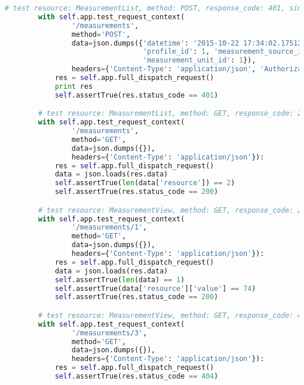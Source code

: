 \begin{itemize}
\begin{lstlisting}[language=Python]
        # test resource: MeasurementList, method: POST, response_code: 401, sin autorizacion, token invalido
        with self.app.test_request_context(
                '/measurements',
                method='POST',
                data=json.dumps({'datetime': '2015-10-22 17:34:02.175126', 'value': 68, 'analysis_id': 1,
                                 'profile_id': 1, 'measurement_source_id': 1, 'measurement_type_id': 1,
                                 'measurement_unit_id': 1}),
                headers={'Content-Type': 'application/json', 'Authorization': 'Basic ' + token_a}):
            res = self.app.full_dispatch_request()
            print res
            self.assertTrue(res.status_code == 401)

        # test resource: MeasurementList, method: GET, response_code: 200
        with self.app.test_request_context(
                '/measurements',
                method='GET',
                data=json.dumps({}),
                headers={'Content-Type': 'application/json'}):
            res = self.app.full_dispatch_request()
            data = json.loads(res.data)
            self.assertTrue(len(data['resource']) == 2)
            self.assertTrue(res.status_code == 200)

        # test resource: MeasurementView, method: GET, response_code: 200
        with self.app.test_request_context(
                '/measurements/1',
                method='GET',
                data=json.dumps({}),
                headers={'Content-Type': 'application/json'}):
            res = self.app.full_dispatch_request()
            data = json.loads(res.data)
            self.assertTrue(len(data) == 1)
            self.assertTrue(data['resource']['value'] == 74)
            self.assertTrue(res.status_code == 200)

        # test resource: MeasurementView, method: GET, response_code: 404
        with self.app.test_request_context(
                '/measurements/3',
                method='GET',
                data=json.dumps({}),
                headers={'Content-Type': 'application/json'}):
            res = self.app.full_dispatch_request()
            self.assertTrue(res.status_code == 404)
\end{lstlisting}


\end{itemize}